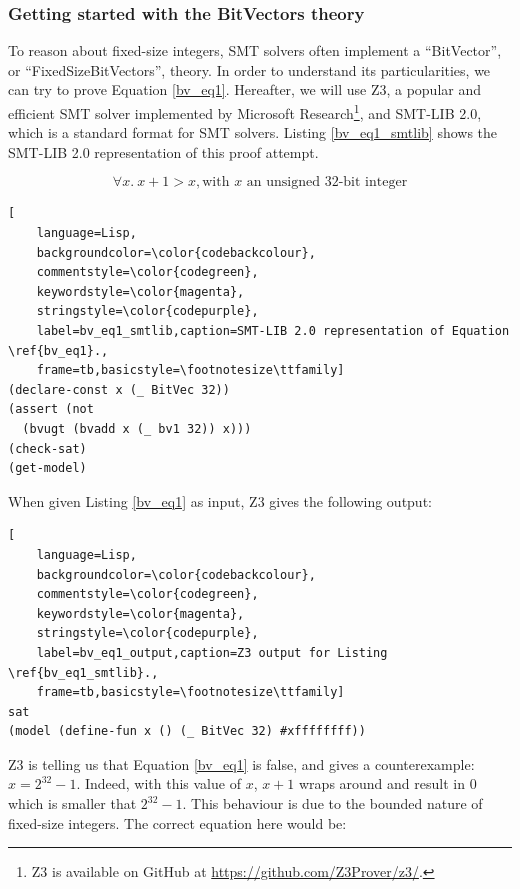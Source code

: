 \documentclass{kththesis}
\begin{document}
\subsubsection{Getting started with the BitVectors theory}

To reason about fixed-size integers, \gls{SMT} solvers often implement a ``BitVector'', or ``FixedSizeBitVectors'', theory. In order to understand its particularities, we can try to prove Equation \ref{bv_eq1}. Hereafter, we will use Z3, a popular and efficient \gls{SMT} solver implemented by Microsoft Research\footnote{Z3 is available on GitHub at \url{https://github.com/Z3Prover/z3/}.}, and SMT-LIB 2.0, which is a standard format for \gls{SMT} solvers. Listing \ref{bv_eq1_smtlib} shows the SMT-LIB 2.0 representation of this proof attempt.

\begin{equation}
    \forall x.~ x + 1 > x, \text{with $x$ an unsigned 32-bit integer}
    \label{bv_eq1}
\end{equation}

\begin{lstlisting}[
    language=Lisp,
    backgroundcolor=\color{codebackcolour},
    commentstyle=\color{codegreen},
    keywordstyle=\color{magenta},
    stringstyle=\color{codepurple},
    label=bv_eq1_smtlib,caption=SMT-LIB 2.0 representation of Equation \ref{bv_eq1}.,
    frame=tb,basicstyle=\footnotesize\ttfamily]
(declare-const x (_ BitVec 32))
(assert (not
  (bvugt (bvadd x (_ bv1 32)) x)))
(check-sat)
(get-model)
\end{lstlisting}

When given Listing \ref{bv_eq1} as input, Z3 gives the following output:

\begin{lstlisting}[
    language=Lisp,
    backgroundcolor=\color{codebackcolour},
    commentstyle=\color{codegreen},
    keywordstyle=\color{magenta},
    stringstyle=\color{codepurple},
    label=bv_eq1_output,caption=Z3 output for Listing \ref{bv_eq1_smtlib}.,
    frame=tb,basicstyle=\footnotesize\ttfamily]
sat
(model (define-fun x () (_ BitVec 32) #xffffffff))
\end{lstlisting}

Z3 is telling us that Equation \ref{bv_eq1} is false, and gives a counterexample: $x=2^{32}-1$. Indeed, with this value of $x$, $x+1$ wraps around and result in $0$ which is smaller that $2^{32}-1$. This behaviour is due to the bounded nature of fixed-size integers. The correct equation here would be:
\end{document}
